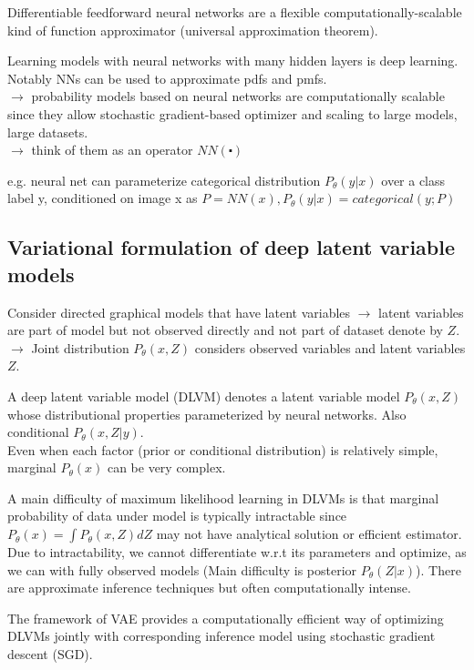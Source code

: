 \documentclass[12pt,a4paper]{article}
\begin{document}
Differentiable feedforward neural networks are a flexible computationally-scalable kind of function approximator (universal approximation theorem). 

Learning models with neural networks with many hidden layers is deep learning. 
Notably NNs can be used to approximate pdfs and pmfs. \\
$\rightarrow$ probability models based on neural networks are computationally scalable since they allow stochastic gradient-based optimizer and scaling to large models, large datasets. \\ 
$\rightarrow$ think of them as an operator $NN(\centerdot)$

e.g. neural net can parameterize categorical distribution $P_\theta(y|x)$ over a class label y, conditioned on image x as $P=NN(x),P_\theta(y|x)=categorical(y;P)$

\subsection{Variational formulation of deep latent variable models}
Consider directed graphical models that have latent variables
$\rightarrow$ latent variables are part of model but not observed directly and not part of dataset denote by $Z$. \\
$\rightarrow$ Joint distribution $P_\theta(x,Z)$ considers observed variables and latent variables $Z$. 

A deep latent variable model (DLVM) denotes a latent variable model $P_\theta(x,Z)$ whose distributional properties parameterized by neural networks. Also conditional $P_\theta(x,Z|y)$. \\
Even when each factor (prior or conditional distribution) is relatively simple, marginal $P_\theta(x)$ can be very complex. 

A main difficulty of maximum likelihood learning in DLVMs is that marginal probability of data under model is typically intractable since $P_\theta(x)=\int P_\theta(x,Z)dZ$ may not have analytical solution or efficient estimator. 
Due to intractability, we cannot differentiate w.r.t its parameters and optimize, as we can with fully observed models (Main difficulty is posterior $P_\theta(Z|x)$). There are approximate inference techniques but often computationally intense. 

The framework of VAE provides a computationally efficient way of optimizing DLVMs jointly with corresponding inference model using stochastic gradient descent (SGD). 
\end{document}
